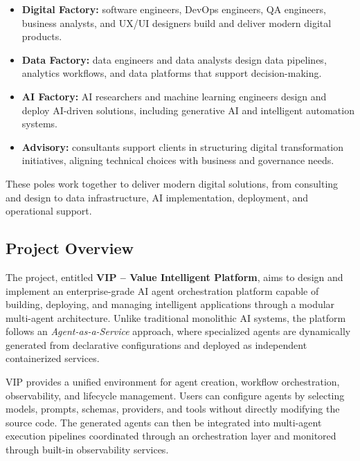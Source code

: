 \begin{itemize}

    \item \textbf{Digital Factory:} software engineers, DevOps engineers, QA engineers, business analysts, and UX/UI designers build and deliver modern digital products.

    \item \textbf{Data Factory:} data engineers and data analysts design data pipelines, analytics workflows, and data platforms that support decision-making.

    \item \textbf{AI Factory:} AI researchers and machine learning engineers design and deploy AI-driven solutions, including generative AI and intelligent automation systems.

    \item \textbf{Advisory:} consultants support clients in structuring digital transformation initiatives, aligning technical choices with business and governance needs.

\end{itemize}

These poles work together to deliver modern digital solutions, from consulting and design to data infrastructure, AI implementation, deployment, and operational support.

\subsection{Project Overview}

The project, entitled \textbf{VIP -- Value Intelligent Platform}, aims to design and implement an enterprise-grade AI agent orchestration platform capable of building, deploying, and managing intelligent applications through a modular multi-agent architecture. Unlike traditional monolithic AI systems, the platform follows an \textit{Agent-as-a-Service} approach, where specialized agents are dynamically generated from declarative configurations and deployed as independent containerized services.

VIP provides a unified environment for agent creation, workflow orchestration, observability, and lifecycle management. Users can configure agents by selecting models, prompts, schemas, providers, and tools without directly modifying the source code. The generated agents can then be integrated into multi-agent execution pipelines coordinated through an orchestration layer and monitored through built-in observability services.

